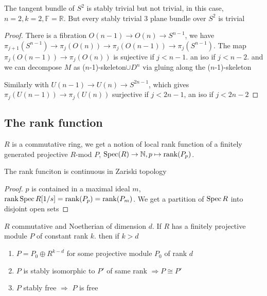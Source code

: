 \documentclass[main]{subfiles}
\begin{document}
\begin{example}
The tangent bundle of $S^2$ is stably trivial but not trivial, in this case, $n=2,k=2,\mathbb F=\mathbb R$. But every stably trivial 3 plane bundle over $S^2$ is trivial
\end{example}

\begin{proof}
There is a fibration $O(n-1)\to O(n)\to S^{n-1}$, we have $\pi_{j+1}(S^{n-1})\to\pi_j(O(n))\to\pi_j(O(n-1))\to\pi_j(S^{n-1})$. The map $\pi_j(O(n-1))\to\pi_j(O(n))$ is sujective if $j<n-1$. an iso if $j<n-2$. and we can decompose $M$ as ($n$-1)-skeleton$\cup D^n$ via gluing along the ($n$-1)-skeleton

Similarly with $U(n-1)\to U(n)\to S^{2n-1}$, which gives $\pi_j(U(n-1))\to\pi_j(U(n))$ surjective if $j<2n-1$, an iso if $j<2n-2$
\end{proof}

\subsection{The rank function}
$R$ is a commutative ring, we get a notion of local rank function of a finitely generated projective $R$-mod $P$, $\operatorname{Spec}(R)\to \mathbb N,p\mapsto\operatorname{rank}(P_p)$. 

\begin{lemma}
The rank funciton is continuous in Zariski topology
\end{lemma}

\begin{proof}
$p$ is contained in a maximal ideal $m$, $\operatorname{rank}\operatorname{Spec} R[1/s]=\operatorname{rank}(P_p)=\operatorname{rank}(P_m)$. We get a partition of $\operatorname{Spec} R$ into disjoint open sets
\end{proof}

\begin{theorem}
$R$ commutative and Noetherian of dimension $d$. If $R$ has a finitely projective module $P$ of constant rank $k$. then if $k>d$
\begin{enumerate}
\item $P=P_0\oplus R^{k-d}$ for some projective module $P_0$ of rank $d$
\item $P$ is stably isomorphic to $P'$ of same rank $\Rightarrow P\cong P'$
\item $P$ stably free $\Rightarrow$ $P$ is free
\end{enumerate}
\end{theorem}
\end{document}
